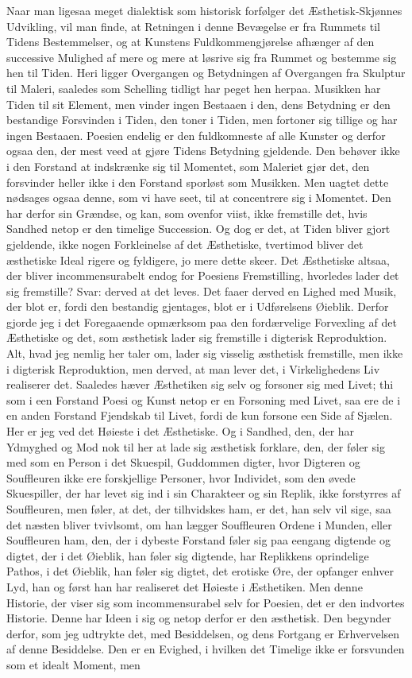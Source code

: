 \documentclass[12pt,a4paper]{article}
\begin{document}
Naar man ligesaa meget dialektisk som historisk forfølger det Æsthetisk-Skjønnes Udvikling, vil man finde, at Retningen i denne Bevægelse er fra Rummets til Tidens Bestemmelser, og at Kunstens Fuldkommengjørelse afhænger af den successive Mulighed af mere og mere at løsrive sig fra Rummet og bestemme sig hen til Tiden. Heri ligger Overgangen og Betydningen af Overgangen fra Skulptur til Maleri, saaledes som Schelling tidligt har peget hen herpaa. Musikken har Tiden til sit Element, men vinder ingen Bestaaen i den, dens Betydning er den bestandige Forsvinden i Tiden, den toner i Tiden, men fortoner sig tillige og har ingen Bestaaen. Poesien endelig er den fuldkomneste af alle Kunster og derfor ogsaa den, der mest veed at gjøre Tidens Betydning gjeldende. Den behøver ikke i den Forstand at indskrænke sig til Momentet, som Maleriet gjør det, den forsvinder heller ikke i den Forstand sporløst som Musikken. Men uagtet dette nødsages ogsaa denne, som vi have seet, til at concentrere sig i Momentet. Den har derfor sin Grændse, og kan, som ovenfor viist, ikke fremstille det, hvis Sandhed netop er den timelige Succession. Og dog er det, at Tiden bliver gjort gjeldende, ikke nogen Forkleinelse af det Æsthetiske, tvertimod bliver det æsthetiske Ideal rigere og fyldigere, jo mere dette skeer. Det Æsthetiske altsaa, der bliver incommensurabelt endog for Poesiens Fremstilling, hvorledes lader det sig fremstille? Svar: derved at det leves. Det faaer derved en Lighed med Musik, der blot er, fordi den bestandig gjentages, blot er i Udførelsens Øieblik. Derfor gjorde jeg i det Foregaaende opmærksom paa den fordærvelige Forvexling af det Æsthetiske og det, som æsthetisk lader sig fremstille i digterisk Reproduktion. Alt, hvad jeg nemlig her taler om, lader sig visselig æsthetisk fremstille, men ikke i digterisk Reproduktion, men derved, at man lever det, i Virkelighedens Liv realiserer det. Saaledes hæver Æsthetiken sig selv og forsoner sig med Livet; thi som i een Forstand Poesi og Kunst netop er en Forsoning med Livet, saa ere de i en anden Forstand Fjendskab til Livet, fordi de kun forsone een Side af Sjælen. Her er jeg ved det Høieste i det Æsthetiske. Og i Sandhed, den, der har Ydmyghed og Mod nok til her at lade sig æsthetisk forklare, den, der føler sig med som en Person i det Skuespil, Guddommen digter, hvor Digteren og Souffleuren ikke ere forskjellige Personer, hvor Individet, som den øvede Skuespiller, der har levet sig ind i sin Charakteer og sin Replik, ikke forstyrres af Souffleuren, men føler, at det, der tilhvidskes ham, er det, han selv vil sige, saa det næsten bliver tvivlsomt, om han lægger Souffleuren Ordene i Munden, eller Souffleuren ham, den, der i dybeste Forstand føler sig paa eengang digtende og digtet, der i det Øieblik, han føler sig digtende, har Replikkens oprindelige Pathos, i det Øieblik, han føler sig digtet, det erotiske Øre, der opfanger enhver Lyd, han og først han har realiseret det Høieste i Æsthetiken. Men denne Historie, der viser sig som incommensurabel selv for Poesien, det er den indvortes Historie. Denne har Ideen i sig og netop derfor er den æsthetisk. Den begynder derfor, som jeg udtrykte det, med Besiddelsen, og dens Fortgang er Erhvervelsen af denne Besiddelse. Den er en Evighed, i hvilken det Timelige ikke er forsvunden som et idealt Moment, men 
\end{document}
